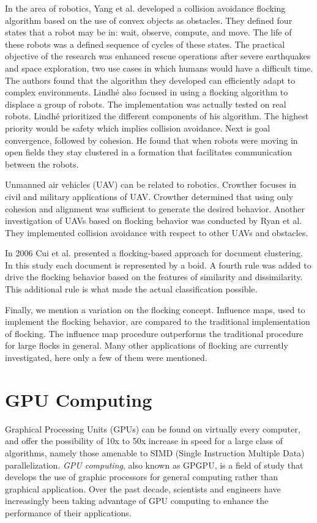 In the area of robotics, Yang et al. developed a collision avoidance flocking algorithm based on the use of convex objects as obstacles\cite{flockingRobots}. They defined four states that a robot may be in: wait, observe, compute, and move. The life of these robots was a defined sequence of cycles of these states. The practical objective of the research was enhanced rescue operations after severe earthquakes and space exploration, two use cases in which humans would have a difficult time. The authors found that the algorithm they developed can efficiently adapt to complex environments. Lindh\'{e} also focused in using a flocking algorithm to displace a group of robots. The implementation was actually tested on real robots\cite{flockingRobotsThesis}. Lindh\'{e} prioritized the different components of his algorithm. The highest priority would be safety which implies collision avoidance. Next is goal convergence, followed by cohesion. He found that when robots were moving in open fields they stay clustered in a formation that facilitates communication between the robots. 

Unmanned air vehicles (UAV) can be related to robotics. Crowther focuses in civil and military applications of  UAV\cite{flockingUAV}. Crowther determined that using only cohesion and alignment was sufficient to generate the desired behavior. Another investigation of UAVs based on flocking behavior was conducted by Ryan et al\cite{UAVControl}. They implemented collision avoidance with respect to other UAVs and obstacles. 

In 2006 Cui et al. presented a flocking-based approach for document clustering\cite{document1}. In this study each document is represented by a boid. A fourth rule was added to drive the flocking behavior based on the features of similarity and dissimilarity. This additional rule is what made the actual classification possible. 

Finally, we mention a variation on the flocking concept.  Influence maps, used to implement the flocking behavior, are compared to the traditional implementation of flocking\cite{flockingInfluenceMaps}. The influence map procedure outperforms the traditional procedure for large flocks in general. Many other applications of flocking are currently investigated, here only a few of them were mentioned.

\section{GPU Computing}
Graphical Processing Units (GPUs) can be found on virtually every computer, and offer the possibility of 10x to 50x increase in speed for a large class of algorithms, namely those amenable to SIMD (Single Instruction Multiple Data)  parallelization. \textit{GPU computing}, also known as GPGPU, is a field of study that develops the use of graphic processors for general computing rather than graphical application. Over the past decade, scientists and engineers have increasingly been taking advantage of GPU computing to enhance the performance of their applications.


